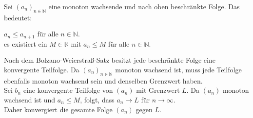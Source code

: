 \documentclass{article}
\begin{document}
Sei \((a_n)_{n \in \mathbb{N}}\) eine monoton wachsende und nach oben beschränkte Folge. Das bedeutet:
\begin{center}
    \(a_n \leq a_{n+1}\) für alle \(n \in \mathbb{N}\). \\
    es existiert ein \(M \in \mathbb{R}\) mit \(a_n \leq M\) für alle \(n \in \mathbb{N}\).
\end{center}

Nach dem Bolzano-Weierstraß-Satz besitzt jede beschränkte Folge eine konvergente Teilfolge. Da \((a_n)_{n \in \mathbb{N}}\) monoton wachsend ist, muss jede Teilfolge ebenfalls monoton wachsend sein und denselben Grenzwert haben.\\

Sei \(b_n\) eine konvergente Teilfolge von \((a_n)\) mit Grenzwert \(L\). Da \((a_n)\) monoton wachsend ist und \(a_n \leq M\), folgt, dass \(a_n \to L\) für \(n \to \infty\). \\

Daher konvergiert die gesamte Folge \((a_n)\) gegen \(L\).
\end{document}
